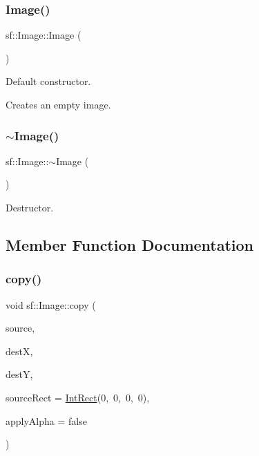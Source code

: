 \subsubsection{\texorpdfstring{Image()}{Image()}}
{\footnotesize\ttfamily sf\+::\+Image\+::\+Image (\begin{DoxyParamCaption}{ }\end{DoxyParamCaption})}



Default constructor. 

Creates an empty image. \begin{DoxyVerb}\end{DoxyVerb}
 \mbox{\label{classsf_1_1_image_a0ba22a38e6c96e3b37dd88198046de83}} 
\subsubsection{\texorpdfstring{$\sim$Image()}{~Image()}}
{\footnotesize\ttfamily sf\+::\+Image\+::$\sim$\+Image (\begin{DoxyParamCaption}{ }\end{DoxyParamCaption})}



Destructor. 

\begin{DoxyVerb}\end{DoxyVerb}
 

\subsection{Member Function Documentation}
\mbox{\label{classsf_1_1_image_ab2fa337c956f85f93377dcb52153a45a}} 
\subsubsection{\texorpdfstring{copy()}{copy()}}
{\footnotesize\ttfamily void sf\+::\+Image\+::copy (\begin{DoxyParamCaption}\item[{const \mbox{\hyperlink{classsf_1_1_image}{Image}} \&}]{source,  }\item[{unsigned int}]{destX,  }\item[{unsigned int}]{destY,  }\item[{const \mbox{\hyperlink{classsf_1_1_rect}{Int\+Rect}} \&}]{source\+Rect = {\ttfamily \mbox{\hyperlink{classsf_1_1_rect}{Int\+Rect}}(0,~0,~0,~0)},  }\item[{bool}]{apply\+Alpha = {\ttfamily false} }\end{DoxyParamCaption})}



